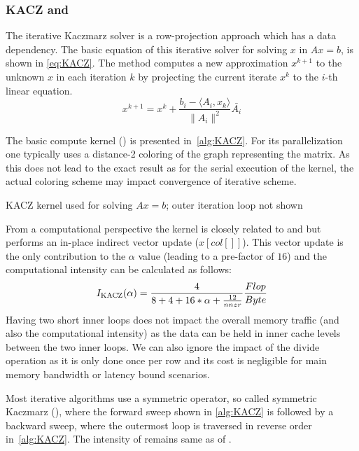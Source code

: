 \subsubsection{KACZ and \SYMMKACZ}
The iterative Kaczmarz solver is a row-projection approach which has a data dependency. The basic equation of this iterative solver for solving $x$ in $Ax = b$, is shown in \cref{eq:KACZ}. The method computes a new approximation $x^{k+1}$ to the unknown $x$ in each iteration $k$ by projecting  the current iterate $x^{k}$ to the $i$-th linear equation. 
\begin{equation}
	\label{eq:KACZ}
	x^{k+1} = x^{k} + \frac{b_i - \langle A_i, x_k \rangle}{\|A_i\|^2} \bar{A_i}
\end{equation}

The basic compute kernel (\KACZ) is  presented in~\cref{alg:KACZ}. For its parallelization one typically uses a distance-2 coloring of the graph representing the matrix. As this does not lead to the exact result as for the serial execution of the kernel, the actual coloring scheme may impact convergence of iterative scheme.

\begin{algorithm}[H]
	\caption{KACZ kernel used for solving $Ax=b$; outer iteration loop not shown} 
	\label{alg:KACZ}
	\begin{algorithmic}[1]
		\ENDFOR
		\ENDFOR
		\ENDFOR
	\end{algorithmic}
\end{algorithm}
From a computational perspective the kernel is closely related to \SpMV and \SymmSpmv but performs an in-place indirect vector update ($x[col[]]$). This vector update is the only contribution to the $\alpha$ value (leading to a pre-factor of $16$) and the computational intensity can be calculated as follows:
\begin{equation}
\label{eq:KACZ_intensity}
I_\mathrm{KACZ} (\alpha)=  \frac{4}{8+4+16*\alpha+\frac{12}{nnzr}} \frac{Flop}{Byte}\\
\end{equation}
Having two short inner loops does not impact the overall memory traffic (and also the computational intensity) as the data can be held in inner cache levels between the two inner loops. We can also ignore the impact of the divide operation as it is only done once per row and its cost is negligible for main memory bandwidth or latency bound scenarios.  

Most iterative algorithms use a symmetric operator, so called symmetric Kaczmarz (\SYMMKACZ), where the forward sweep shown in \cref{alg:KACZ} is followed by a backward sweep, where the outermost loop is traversed in reverse order   in~\cref{alg:KACZ}. The intensity of \SYMMKACZ remains same as of \KACZ. 

